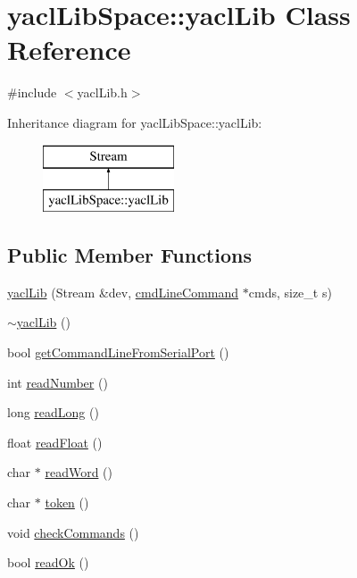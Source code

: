 \hypertarget{classyacl_lib_space_1_1yacl_lib}{}\section{yacl\+Lib\+Space\+::yacl\+Lib Class Reference}
\label{classyacl_lib_space_1_1yacl_lib}


{\ttfamily \#include $<$yacl\+Lib.\+h$>$}

Inheritance diagram for yacl\+Lib\+Space\+::yacl\+Lib\+:\begin{figure}[H]
\begin{center}
\leavevmode
\includegraphics[height=2.000000cm]{classyacl_lib_space_1_1yacl_lib}
\end{center}
\end{figure}
\subsection*{Public Member Functions}
\begin{DoxyCompactItemize}
\item 
\mbox{\hyperlink{classyacl_lib_space_1_1yacl_lib_aa4d00d08ccca7681664fb834b021d4ef}{yacl\+Lib}} (Stream \&dev, \mbox{\hyperlink{structyacl_lib_space_1_1cmd_line_command}{cmd\+Line\+Command}} $\ast$cmds, size\+\_\+t s)
\item 
\mbox{\hyperlink{classyacl_lib_space_1_1yacl_lib_aeba285285a7c9f9ec69348f5e0373ec5}{$\sim$yacl\+Lib}} ()
\item 
bool \mbox{\hyperlink{classyacl_lib_space_1_1yacl_lib_aafffa242222d116ceba1352b076dec62}{get\+Command\+Line\+From\+Serial\+Port}} ()
\item 
int \mbox{\hyperlink{classyacl_lib_space_1_1yacl_lib_ac1bf1763da556804be2f1a5e99d67cf3}{read\+Number}} ()
\item 
long \mbox{\hyperlink{classyacl_lib_space_1_1yacl_lib_a9cae301de3febbd9729b6b1a98e1babe}{read\+Long}} ()
\item 
float \mbox{\hyperlink{classyacl_lib_space_1_1yacl_lib_afc65d88691ee736904288e1225dcc047}{read\+Float}} ()
\item 
char $\ast$ \mbox{\hyperlink{classyacl_lib_space_1_1yacl_lib_a4c977d203e4246a6739ba90a4556c53e}{read\+Word}} ()
\item 
char $\ast$ \mbox{\hyperlink{classyacl_lib_space_1_1yacl_lib_a7d87b7a96b320c48236e9e411063f42b}{token}} ()
\item 
void \mbox{\hyperlink{classyacl_lib_space_1_1yacl_lib_a0348513dc670e82c241ac88bcb24bd54}{check\+Commands}} ()
\item 
bool \mbox{\hyperlink{classyacl_lib_space_1_1yacl_lib_aad6cf02e5731fefd436e3194f608718e}{read\+Ok}} ()
\end{DoxyCompactItemize}
